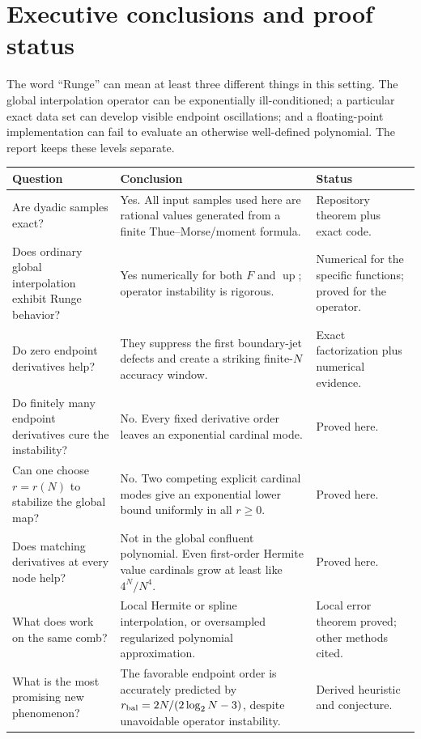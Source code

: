 \documentclass[11pt,oneside]{article}
\theoremstyle{definition}
\theoremstyle{remark}
\newcommand{\Up}{\operatorname{up}}
\begin{document}
\tableofcontents
\newpage

\section{Executive conclusions and proof status}

The word ``Runge'' can mean at least three different things in this setting.  The global
interpolation operator can be exponentially ill-conditioned; a particular exact data set
can develop visible endpoint oscillations; and a floating-point implementation can fail to
evaluate an otherwise well-defined polynomial.  The report keeps these levels separate.

\begin{center}
\small
\begin{tabularx}{\textwidth}{@{}p{}X p{}@{}}
\toprule
Question & Conclusion & Status \\
\midrule
Are dyadic samples exact? & Yes.  All input samples used here are rational values generated from a finite Thue--Morse/moment formula. & Repository theorem plus exact code.\\
Does ordinary global interpolation exhibit Runge behavior? & Yes numerically for both $F$ and $\Up$; operator instability is rigorous. & Numerical for the specific functions; proved for the operator.\\
Do zero endpoint derivatives help? & They suppress the first boundary-jet defects and create a striking finite-$N$ accuracy window. & Exact factorization plus numerical evidence.\\
Do finitely many endpoint derivatives cure the instability? & No.  Every fixed derivative order leaves an exponential cardinal mode. & Proved here.\\
Can one choose $r=r(N)$ to stabilize the global map? & No.  Two competing explicit cardinal modes give an exponential lower bound uniformly in all $r\ge0$. & Proved here.\\
Does matching derivatives at every node help? & Not in the global confluent polynomial.  Even first-order Hermite value cardinals grow at least like $4^N/N^4$. & Proved here.\\
What does work on the same comb? & Local Hermite or spline interpolation, or oversampled regularized polynomial approximation. & Local error theorem proved; other methods cited.\\
What is the most promising new phenomenon? & The favorable endpoint order is accurately predicted by $r_{\rm bal}=2N/(2\log_2N-3)$, despite unavoidable operator instability. & Derived heuristic and conjecture.\\
\bottomrule
\end{tabularx}
\end{center}
\end{document}
